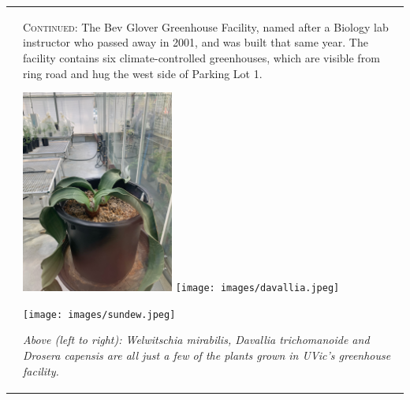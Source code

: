 \documentclass[fleqn]{article}
\begin{document}
\begin{tabular}{@{}
                         p{}%
		         @{\hspace{.04\columnwidth}}%
		         p{}%
		         @{}%
}
&\large
\lettrine[lines=3]{}{Continued}: The Bev Glover Greenhouse Facility, named after a Biology lab instructor who passed away in 2001, and was built that same year. The facility contains six climate-controlled greenhouses, which are visible from ring road and hug the west side of Parking Lot 1. \linebreak\
\par\medskip
\includegraphics[width=5cm]{images/welwitschia.jpeg}\hfill
\texttt{[image: images/davallia.jpeg]}\hfill
\par\bigskip
\texttt{[image: images/sundew.jpeg]}\hfill
\sffamily\lite\fontsize{10}{10}\selectfont\raggedright 
\par\bigskip
\emph{Above (left to right): \emph{Welwitschia mirabilis}, \emph{Davallia trichomanoide} and \emph{Drosera capensis} are all just a few of the plants grown in UVic's greenhouse facility.}
\vfill
\end{tabular}
\clearpage
\end{document}

